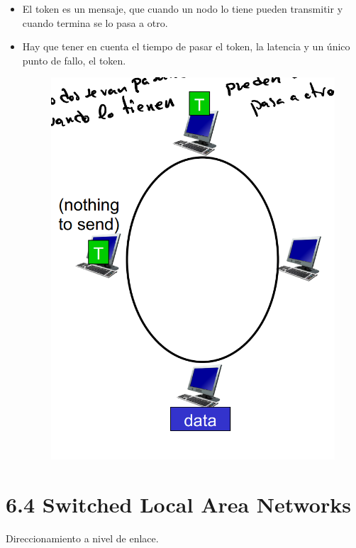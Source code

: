 \documentclass[12pt, twoside, openright]{report} %
\begin{document}
\begin{itemize}
	\item El token es un mensaje, que cuando un nodo lo tiene pueden
	      transmitir y cuando termina se lo pasa a otro.
	\item Hay que tener en cuenta el tiempo de pasar el token, la
	      latencia y un único punto de fallo, el token.
	      \begin{figure}[H]
		      {\includegraphics[scale=.25]{Untitled 56.png}}
	      \end{figure}
\end{itemize}

\section{6.4 Switched Local Area Networks}

Direccionamiento a nivel de enlace.
\end{document}
